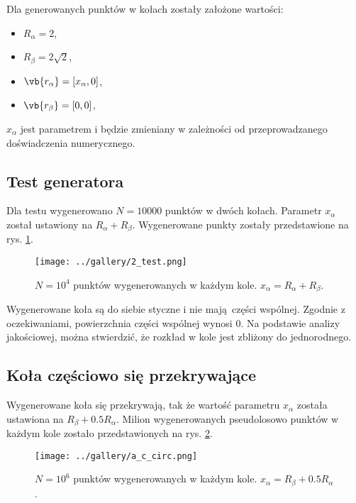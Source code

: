 \documentclass[a4paper, 12pt]{article}
\begin{document}
    Dla generowanych punktów w kołach zostały założone wartości: 
    \begin{itemize}
        \item $R_\alpha =  2$,
        \item $R_\beta = 2\sqrt{2}$,
        \item $\vb{r_\alpha} = [x_\alpha, 0]$,
        \item $\vb{r_\beta} = [0,0] $,
    \end{itemize}
    $x_\alpha$ jest parametrem i będzie zmieniany w zależności od przeprowadzanego doświadczenia numerycznego.

    \subsection*{Test generatora}

    Dla testu wygenerowano $N = 10000$ punktów w dwóch kołach. 
    Parametr $x_\alpha$ został ustawiony na $R_\alpha + R_\beta$.
    Wygenerowane punkty zostały przedstawione na rys. \ref{fig:test_2}. 
    \begin{figure}[H]
        \centering
        \texttt{[image: ../gallery/2\_test.png]}
        \caption{$N = 10^4$ punktów wygenerowanych w każdym kole. $x_\alpha = R_\alpha + R_\beta$.}
        \label{fig:test_2}
    \end{figure}
    
    \noaka Wygenerowane koła są do siebie styczne i nie mają części wspólnej.
    Zgodnie z oczekiwaniami, powierzchnia części wspólnej wynosi $0$. 
    Na podstawie analizy jakościowej, można stwierdzić, że rozkład w kole jest zbliżony do jednorodnego.

    \subsection*{Koła częściowo się przekrywające}

    Wygenerowane koła się przekrywają, tak że wartość parametru $x_\alpha$ została ustawiona na $R_\beta + 0.5 R_\alpha$.
    Milion wygenerowanych pseudolosowo punktów w każdym kole zostało przedstawionych na rys. \ref{fig:ac_circ}.
    \begin{figure}[H]
        \centering
        \texttt{[image: ../gallery/a\_c\_circ.png]}
        \caption{$N = 10^6$ punktów wygenerowanych w każdym kole. $x_\alpha = R_\beta + 0.5R_\alpha $.}
        \label{fig:ac_circ}
    \end{figure}
    
\end{document}
